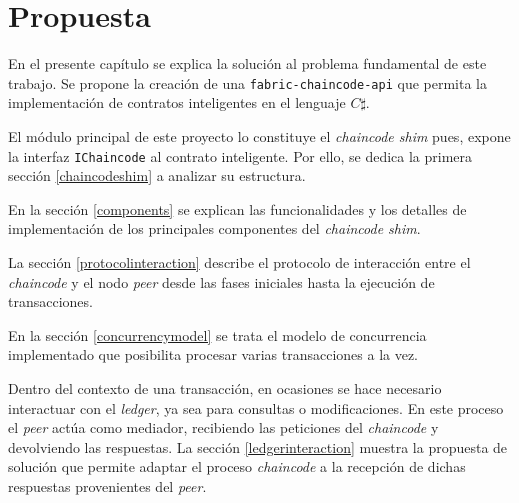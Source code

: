 \chapter{Propuesta}\label{chapter:proposal}
En el presente capítulo se explica la solución al problema fundamental de este trabajo. Se propone la creación de una \texttt{fabric-chaincode-api} que permita la implementación de contratos inteligentes en el lenguaje $ C\sharp $.

El módulo principal de este proyecto lo constituye el \textit{chaincode shim }pues, expone la interfaz \texttt{IChaincode} al contrato inteligente. Por ello, se dedica la primera sección \ref{chaincodeshim} a analizar su estructura.

En la sección \ref{components} se explican las funcionalidades y los detalles de implementación de los principales componentes del \textit{chaincode shim}.

La sección \ref{protocolinteraction} describe el protocolo de interacción entre el \textit{chaincode} y el nodo \textit{peer} desde las fases iniciales hasta la ejecución de transacciones.

En la sección \ref{concurrencymodel} se trata el modelo de concurrencia implementado que posibilita procesar varias transacciones a la vez.

Dentro del contexto de una transacción, en ocasiones se hace necesario interactuar con el \textit{ledger}, ya sea para consultas o modificaciones. En este proceso el \textit{peer} actúa como mediador, recibiendo las peticiones del \textit{chaincode} y devolviendo las respuestas. La sección \ref{ledgerinteraction} muestra la propuesta de solución que permite adaptar el proceso \textit{chaincode} a la recepción de dichas respuestas provenientes del \textit{peer}.



